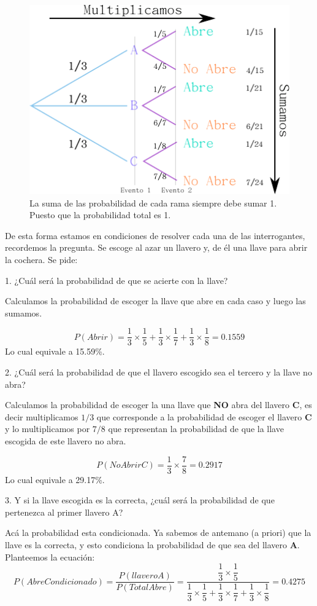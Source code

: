 \documentclass[11pt,letterpaper]{report}
\begin{document}
      \begin{figure}[!h]
          \centering
          \includegraphics[width=0.5\linewidth]{images/cp1}
          \caption{La suma de las probabilidad de cada rama siempre debe sumar 1. Puesto que la probabilidad total es 1.}
          \label{fig:cp1}
      \end{figure}


      De esta forma estamos en condiciones de resolver cada una de las interrogantes, recordemos la pregunta. Se escoge al azar un llavero y, de él una llave para abrir la cochera. Se pide:

      1. ¿Cuál será la probabilidad de que se acierte con la llave?

      Calculamos la probabilidad de escoger la llave que abre en cada caso y luego las sumamos.

      $$P(Abrir)=\dfrac{1}{3}\times\dfrac{1}{5}+\dfrac{1}{3}\times\dfrac{1}{7}+\dfrac{1}{3}\times\dfrac{1}{8}=0.1559$$
      Lo cual equivale a 15.59\%.

      2. ¿Cuál será la probabilidad de que el llavero escogido sea el tercero y la llave no abra?

      Calculamos la probabilidad de escoger la una llave que \textbf{NO} abra del llavero \textbf{C}, es decir multiplicamos $1/3$ que corresponde a la probabilidad de escoger el llavero \textbf{C} y lo multiplicamos por $7/8$ que representan la probabilidad de que la llave escogida de este llavero no abra.

      $$P(NoAbrirC)=\dfrac{1}{3}\times\dfrac{7}{8}=0.2917$$
      Lo cual equivale a 29.17\%.

      3. Y si la llave escogida es la correcta, ¿cuál será la probabilidad de que pertenezca al primer llavero A?

      Acá la probabilidad esta condicionada. Ya sabemos de antemano (a priori) que la llave es la correcta, y esto condiciona la probabilidad de que sea del llavero \textbf{A}. Planteemos la ecuación:
      $$P(AbreCondicionado)=\dfrac{P(llaveroA)}{P(TotalAbre)}=\dfrac{\dfrac{1}{3}\times\dfrac{1}{5}}{\dfrac{1}{3}\times\dfrac{1}{5}+\dfrac{1}{3}\times\dfrac{1}{7}+\dfrac{1}{3}\times\dfrac{1}{8}}=0.4275$$
\end{document}
